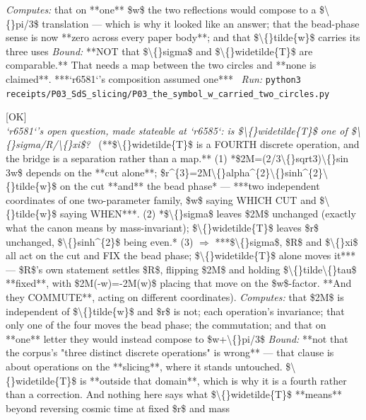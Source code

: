 \begin{description}
\emph{Computes:} that on **one** \$w\$ the two reflections would compose to a \$\textbackslash\{\}pi/3\$ translation --- which is why it looked like an answer; that the bead-phase sense is now **zero across every paper body**; and that \$\textbackslash\{\}tilde\{w\}\$ carries its three uses
 \emph{Bound:}  **NOT that \$\textbackslash\{\}sigma\$ and \$\textbackslash\{\}widetilde\{T\}\$ are comparable.** That needs a map between the two circles and **none is claimed**. ***`r6581`'s composition assumed one***
\ \emph{Run:} \texttt{python3 receipts/P03\_SdS\_slicing/P03\_the\_symbol\_w\_carried\_two\_circles.py}
\item[\rcptlabel{P03_widetilde_T_is_a_fourth_discrete_operation}{P3R67}\textbf{P3R67}\quad\texttt{P03\_widetilde\_T\_is\_a\_fourth\_discrete\_operation}]\hfill\textsf{[OK]}\\
\textit{`r6581`'s open question, made stateable at `r6585`: is \$\textbackslash\{\}widetilde\{T\}\$ one of \$\textbackslash\{\}sigma/R/\textbackslash\{\}xi\$?} \ (**\$\textbackslash\{\}widetilde\{T\}\$ is a FOURTH discrete operation, and the bridge is a separation rather than a map.** (1) *\$2M=(2/3\textbackslash\{\}sqrt3)\textbackslash\{\}sin 3w\$ depends on the **cut alone**; \$r\textasciicircum{}\{3\}=2M\textbackslash\{\}alpha\textasciicircum{}\{2\}\textbackslash\{\}sinh\textasciicircum{}\{2\}\textbackslash\{\}tilde\{w\}\$ on the cut **and** the bead phase* --- ***two independent coordinates of one two-parameter family, \$w\$ saying WHICH CUT and \$\textbackslash\{\}tilde\{w\}\$ saying WHEN***. (2) *\$\textbackslash\{\}sigma\$ leaves \$2M\$ unchanged (exactly what the canon means by mass-invariant); \$\textbackslash\{\}widetilde\{T\}\$ leaves \$r\$ unchanged, \$\textbackslash\{\}sinh\textasciicircum{}\{2\}\$ being even.* (3) \ensuremath{\Rightarrow} ***\$\textbackslash\{\}sigma\$, \$R\$ and \$\textbackslash\{\}xi\$ all act on the cut and FIX the bead phase; \$\textbackslash\{\}widetilde\{T\}\$ alone moves it*** --- \$R\$'s own statement settles \$R\$, flipping \$2M\$ and holding \$\textbackslash\{\}tilde\textbackslash\{\}tau\$ **fixed**, with \$2M(-w)=-2M(w)\$ placing that move on the \$w\$-factor.  **And they COMMUTE**, acting on different coordinates). 
\emph{Computes:} that \$2M\$ is independent of \$\textbackslash\{\}tilde\{w\}\$ and \$r\$ is not; each operation's invariance; that only one of the four moves the bead phase; the commutation; and that on **one** letter they would instead compose to \$w+\textbackslash\{\}pi/3\$
 \emph{Bound:}  **not that the corpus's "three distinct discrete operations" is wrong** --- that clause is about operations on the **slicing**, where it stands untouched. \$\textbackslash\{\}widetilde\{T\}\$ is **outside that domain**, which is why it is a fourth rather than a correction. And nothing here says what \$\textbackslash\{\}widetilde\{T\}\$ **means** beyond reversing cosmic time at fixed \$r\$ and mass

\end{description}
